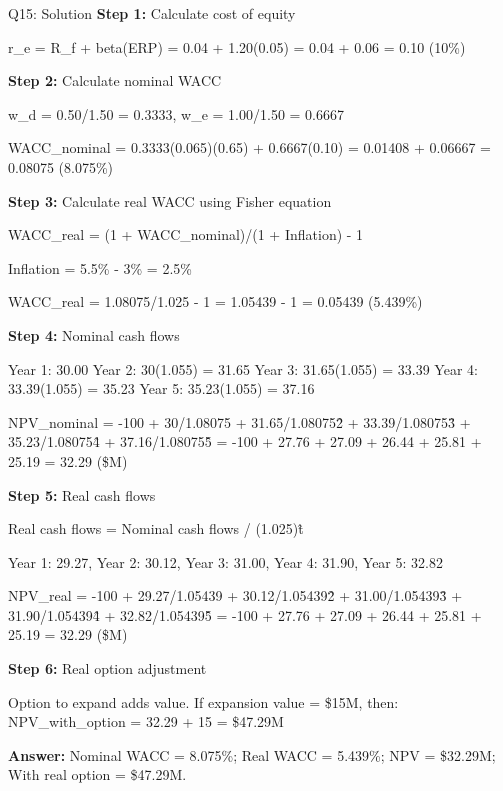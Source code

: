 \documentclass{beamer}
\renewcommand{\scriptsize}{\fontsize{6pt}{7pt}\selectfont}
\begin{document}
	\begin{frame}{Q15: Solution}
		\scriptsize
		\textbf{Step 1:} Calculate cost of equity
		
		r\_e = R\_f + beta(ERP) = 0.04 + 1.20(0.05) = 0.04 + 0.06 = 0.10 (10\%)
		
		\vspace{2pt}
		\textbf{Step 2:} Calculate nominal WACC
		
		w\_d = 0.50/1.50 = 0.3333, w\_e = 1.00/1.50 = 0.6667
		
		WACC\_nominal = 0.3333(0.065)(0.65) + 0.6667(0.10)
		= 0.01408 + 0.06667 = 0.08075 (8.075\%)
		
		\vspace{2pt}
		\textbf{Step 3:} Calculate real WACC using Fisher equation
		
		WACC\_real = (1 + WACC\_nominal)/(1 + Inflation) - 1
		
		Inflation = 5.5\% - 3\% = 2.5\%
		
		WACC\_real = 1.08075/1.025 - 1 = 1.05439 - 1 = 0.05439 (5.439\%)
		
		\vspace{2pt}
		\textbf{Step 4:} Nominal cash flows
		
		Year 1: 30.00
		Year 2: 30(1.055) = 31.65
		Year 3: 31.65(1.055) = 33.39
		Year 4: 33.39(1.055) = 35.23
		Year 5: 35.23(1.055) = 37.16
		
		NPV\_nominal = -100 + 30/1.08075 + 31.65/1.08075\^2 + 33.39/1.08075\^3 + 35.23/1.08075\^4 + 37.16/1.08075\^5
		= -100 + 27.76 + 27.09 + 26.44 + 25.81 + 25.19 = 32.29 (\$M)
		
		\vspace{2pt}
		\textbf{Step 5:} Real cash flows
		
		Real cash flows = Nominal cash flows / (1.025)\^t
		
		Year 1: 29.27, Year 2: 30.12, Year 3: 31.00, Year 4: 31.90, Year 5: 32.82
		
		NPV\_real = -100 + 29.27/1.05439 + 30.12/1.05439\^2 + 31.00/1.05439\^3 + 31.90/1.05439\^4 + 32.82/1.05439\^5
		= -100 + 27.76 + 27.09 + 26.44 + 25.81 + 25.19 = 32.29 (\$M)
		
		\vspace{2pt}
		\textbf{Step 6:} Real option adjustment
		
		Option to expand adds value. If expansion value = \$15M, then:
		NPV\_with\_option = 32.29 + 15 = \$47.29M
		
		\textbf{Answer:} Nominal WACC = 8.075\%; Real WACC = 5.439\%; NPV = \$32.29M; With real option = \$47.29M.
	\end{frame}
	
\end{document}
